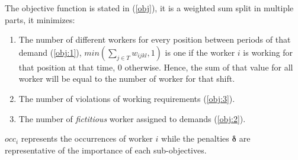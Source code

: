 \documentclass[../../thesis.tex]{subfiles}
\begin{document}
The objective function is stated in (\ref{obj}), it is a weighted sum split in multiple parts, it minimizes:

\begin{enumerate}
  \item The number of different workers for every position between periods of that demand (\ref{obj:1}), $min(\sum_{j \in T} w_{ijkl}, 1)$ is one if the worker $i$ is working for that position at that time, 0 otherwise. Hence, the sum of that value for all worker will be equal to the number of worker for that shift.
  \item The number of violations of working requirements (\ref{obj:3}).
  \item The number of \emph{fictitious} worker assigned to demands (\ref{obj:2}).
\end{enumerate}

$occ_i$ represents the occurrences of worker $i$ while the penalties $\bm{\delta}$ are representative of the importance of each sub-objectives.

\end{document}
